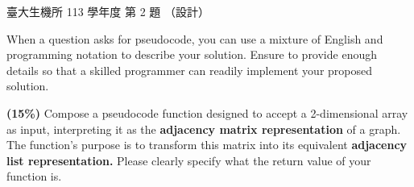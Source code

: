 \begin{pastexam}[label={px:ntu-113-bme-ds-02}]{臺大生機所 113 學年度 第 2 題}
（設計）

When a question asks for pseudocode, you can use a mixture of English and programming notation to
describe your solution. Ensure to provide enough details so that a skilled programmer can readily
implement your proposed solution.

\textbf{(15\%)} Compose a pseudocode function designed to accept a 2-dimensional array as input,
interpreting it as the \textbf{adjacency matrix representation} of a graph. The function's purpose is
to transform this matrix into its equivalent \textbf{adjacency list representation.} Please clearly
specify what the return value of your function is.
\end{pastexam}


